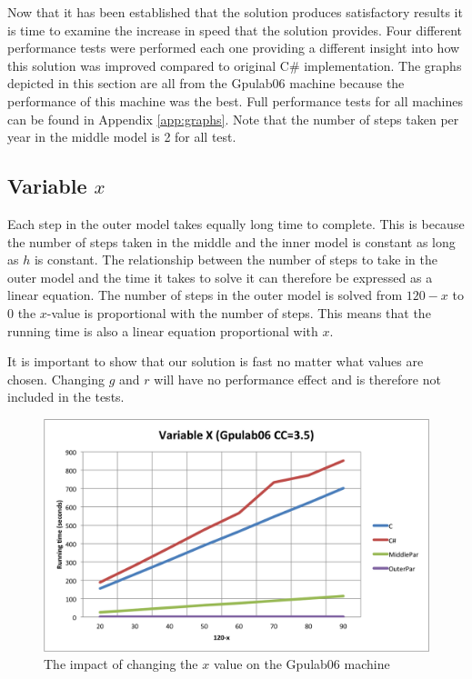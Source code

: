 
Now that it has been established that the solution produces satisfactory results it is time to examine the increase in speed that the solution provides. Four different performance tests were performed each one providing a different insight into how this solution was improved compared to original C\# implementation. The graphs depicted in this section are all from the Gpulab06 machine because the performance of this machine was the best. Full performance tests for all machines can be found in Appendix \ref{app:graphs}. Note that the number of steps taken per year in the middle model is 2 for all test.\\

\subsection{Variable $x$}

Each step in the outer model takes equally long time to complete. This is because the number of steps taken in the middle and the inner model is constant as long as $h$ is constant. 
The relationship between the number of steps to take in the outer model and the time it takes to solve it can therefore be expressed as a linear equation. 
The number of steps in the outer model is solved from $120-x$ to 0 the $x$-value is proportional with the number of steps. This means that the running time is also a linear equation proportional with $x$.

It is important to show that our solution is fast no matter what values are chosen. Changing $g$ and $r$ will have no performance effect and is therefore not included in the tests.

\begin{figure}
\begin{center}
	\includegraphics[width=\textwidth]{img/Gpulab-varx35.png}
\end{center}
\caption{The impact of changing the $x$ value on the Gpulab06 machine}
\label{variablex}
\end{figure}

